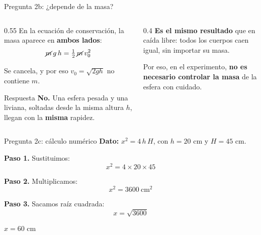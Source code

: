 \documentclass[aspectratio=169,xcolor=dvipsnames]{beamer}
\begin{document}
	\begin{frame}{Pregunta 2b: ¿depende de la masa?}
		\begin{columns}[T]
			\begin{column}{0.55\textwidth}
				\small
				En la ecuación de conservación, la masa aparece en \textbf{ambos
					lados}:
				\[
				\cancel{m}\,g\,h = \tfrac{1}{2}\,\cancel{m}\,v_0^{2}
				\]
				
				\vspace{0.2cm}
				Se cancela, y por eso $v_0 = \sqrt{2gh}$ no contiene $m$.
				
				\begin{exampleblock}{Respuesta}
					\centering
					\textbf{No.} Una esfera pesada y una liviana, soltadas desde la
					misma altura $h$, llegan con la \textbf{misma} rapidez.
				\end{exampleblock}
			\end{column}
			\begin{column}{0.4\textwidth}
				\small
				\textcolor{UnalGreen}{\textbf{Es el mismo resultado}} que en caída
				libre: todos los cuerpos caen igual, sin importar su masa.
				
				\vspace{0.3cm}
				Por eso, en el experimento, \textbf{no es necesario controlar la
					masa} de la esfera con cuidado.
			\end{column}
		\end{columns}
	\end{frame}
	
	\begin{frame}{Pregunta 2c: cálculo numérico}
		\small
		\textbf{Dato:} $x^{2} = 4\,h\,H$, \quad con $h = 20$ cm y $H = 45$ cm.
		
		\vspace{0.4cm}
		\textbf{Paso 1.} Sustituimos:
		\[
		x^{2} = 4 \times 20 \times 45
		\]
		
		\textbf{Paso 2.} Multiplicamos:
		\[
		x^{2} = 3600 \ \text{cm}^2
		\]
		
		\textbf{Paso 3.} Sacamos raíz cuadrada:
		\[
		x = \sqrt{3600}
		\]
		
		\vspace{0.2cm}
		\begin{exampleblock}{}
			\centering
			\Large $x = 60$ cm
		\end{exampleblock}
	\end{frame}
	
\end{document}
